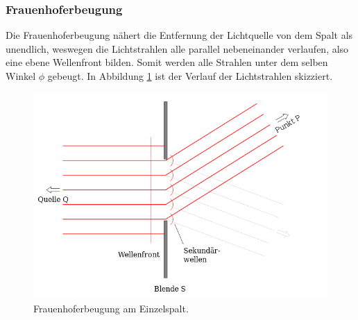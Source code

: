 \subsubsection*{Frauenhoferbeugung}
Die Frauenhoferbeugung nähert die Entfernung der Lichtquelle von dem Spalt als unendlich, weswegen die Lichtstrahlen alle parallel nebeneinander verlaufen, also
eine ebene Wellenfront bilden. Somit werden alle Strahlen unter dem selben Winkel $\phi$ gebeugt. In Abbildung \ref{fig:frauenhofer} ist der Verlauf der
Lichtstrahlen skizziert.
\begin{figure}[H]
    \centering
    \includegraphics[scale = 0.45]{pictures/frauenhofer.png}
    \caption{Frauenhoferbeugung am Einzelspalt. \cite{AP02}}
    \label{fig:frauenhofer}
\end{figure}
\noindent


